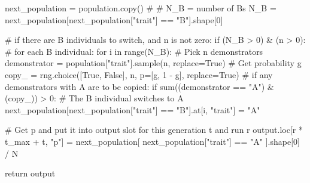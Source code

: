 \documentclass[
  a4paperpaper,
  ,captions=tableheading
]{scrbook}
\newenvironment{Shaded}{\begin{snugshade}}{\end{snugshade}}
\newcommand{\BuiltInTok}[1]{\textcolor[rgb]{0.00,0.23,0.31}{#1}}
\newcommand{\CommentTok}[1]{\textcolor[rgb]{0.37,0.37,0.37}{#1}}
\newcommand{\ControlFlowTok}[1]{\textcolor[rgb]{0.00,0.23,0.31}{#1}}
\newcommand{\DecValTok}[1]{\textcolor[rgb]{0.68,0.00,0.00}{#1}}
\newcommand{\KeywordTok}[1]{\textcolor[rgb]{0.00,0.23,0.31}{#1}}
\newcommand{\NormalTok}[1]{\textcolor[rgb]{0.00,0.23,0.31}{#1}}
\newcommand{\OperatorTok}[1]{\textcolor[rgb]{0.37,0.37,0.37}{#1}}
\newcommand{\StringTok}[1]{\textcolor[rgb]{0.13,0.47,0.30}{#1}}
\newcommand{\VariableTok}[1]{\textcolor[rgb]{0.07,0.07,0.07}{#1}}
\begin{document}
\begin{Shaded}
\begin{Highlighting}[]
\NormalTok{            next\_population }\OperatorTok{=}\NormalTok{ population.copy()}
            \CommentTok{\# \# N\_B = number of Bs}
\NormalTok{            N\_B }\OperatorTok{=}\NormalTok{ next\_population[next\_population[}\StringTok{"trait"}\NormalTok{] }\OperatorTok{==} \StringTok{"B"}\NormalTok{].shape[}\DecValTok{0}\NormalTok{]}

            \CommentTok{\# if there are B individuals to switch, and n is not zero:}
            \ControlFlowTok{if}\NormalTok{ (N\_B }\OperatorTok{\textgreater{}} \DecValTok{0}\NormalTok{) }\OperatorTok{\&}\NormalTok{ (n }\OperatorTok{\textgreater{}} \DecValTok{0}\NormalTok{):}
                \CommentTok{\# for each B individual:}
                \ControlFlowTok{for}\NormalTok{ i }\KeywordTok{in} \BuiltInTok{range}\NormalTok{(N\_B):}
                    \CommentTok{\# Pick n demonstrators}
\NormalTok{                    demonstrator }\OperatorTok{=}\NormalTok{ population[}\StringTok{"trait"}\NormalTok{].sample(n, replace}\OperatorTok{=}\VariableTok{True}\NormalTok{)}
                    \CommentTok{\# Get probability g }
\NormalTok{                    copy\_ }\OperatorTok{=}\NormalTok{ rng.choice([}\VariableTok{True}\NormalTok{, }\VariableTok{False}\NormalTok{], n, p}\OperatorTok{=}\NormalTok{[g, }\DecValTok{1} \OperatorTok{{-}}\NormalTok{ g], replace}\OperatorTok{=}\VariableTok{True}\NormalTok{)}
                    \CommentTok{\# if any demonstrators with A are to be copied:}
                    \ControlFlowTok{if} \BuiltInTok{sum}\NormalTok{((demonstrator }\OperatorTok{==} \StringTok{"A"}\NormalTok{) }\OperatorTok{\&}\NormalTok{ (copy\_)) }\OperatorTok{\textgreater{}} \DecValTok{0}\NormalTok{:}
                      \CommentTok{\# The B individual switches to A }
\NormalTok{                      next\_population[next\_population[}\StringTok{"trait"}\NormalTok{] }\OperatorTok{==} \StringTok{"B"}\NormalTok{].at[i, }\StringTok{"trait"}\NormalTok{] }\OperatorTok{=} \StringTok{"A"}

            \CommentTok{\# Get p and put it into output slot for this generation t and run r}
\NormalTok{            output.loc[r }\OperatorTok{*}\NormalTok{ t\_max }\OperatorTok{+}\NormalTok{ t, }\StringTok{"p"}\NormalTok{] }\OperatorTok{=}\NormalTok{ next\_population[ next\_population[}\StringTok{"trait"}\NormalTok{] }\OperatorTok{==} \StringTok{"A"}\NormalTok{ ].shape[}\DecValTok{0}\NormalTok{] }\OperatorTok{/}\NormalTok{ N}

    \ControlFlowTok{return}\NormalTok{ output}
\end{Highlighting}
\end{Shaded}
\end{document}
